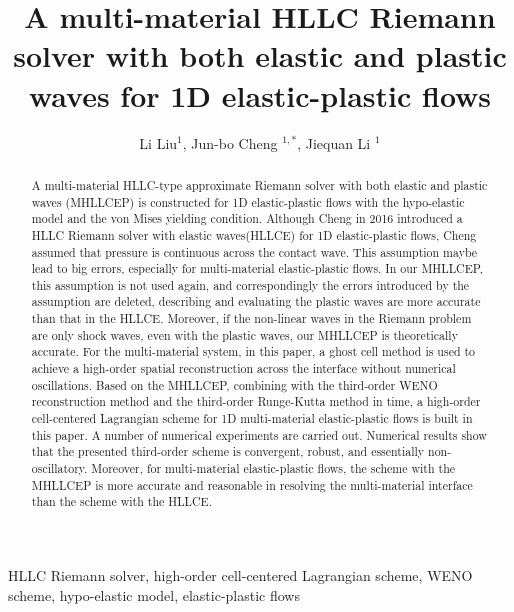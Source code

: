 \documentclass[review]{elsarticle}
\begin{document}
\begin{frontmatter}

\title{A multi-material HLLC Riemann solver with both elastic and plastic waves for 1D  elastic-plastic flows}
\author{Li Liu$^1$, Jun-bo Cheng $^{1,*}$, Jiequan Li $^{1}$}

\maketitle

\address{$^1$  Institute of Applied Physics and Computational Mathematics, Beijing 100094, China }

\begin{abstract}
  A multi-material HLLC-type  approximate Riemann solver with both elastic and plastic waves (MHLLCEP) is constructed for 1D elastic-plastic flows with the  hypo-elastic model and the von Mises yielding condition. Although Cheng in 2016 introduced a HLLC Riemann solver with elastic waves(HLLCE) for 1D elastic-plastic flows, Cheng assumed that pressure is continuous across the contact wave. This assumption maybe lead to big errors, especially for multi-material elastic-plastic flows. In our MHLLCEP, this assumption is not used again, and correspondingly the errors introduced by the assumption are deleted, describing and evaluating the plastic waves are more accurate than that in the HLLCE. Moreover, if the non-linear waves in the Riemann problem are only shock waves, even with the plastic waves, our MHLLCEP is theoretically accurate. For  the multi-material system, in this paper, a ghost cell method is used to achieve a high-order spatial reconstruction across the interface without numerical oscillations. Based on the MHLLCEP, combining with the third-order WENO reconstruction method and the third-order Runge-Kutta method in time, a high-order cell-centered Lagrangian scheme for 1D multi-material elastic-plastic flows is built in this paper. A number of numerical experiments are carried out. Numerical results show  that the presented third-order scheme is convergent, robust, and essentially non-oscillatory. Moreover, for multi-material elastic-plastic flows, the scheme with  the MHLLCEP is more accurate and reasonable in resolving the multi-material interface than the scheme with the  HLLCE.
\end{abstract}

\begin{keyword}
  HLLC Riemann solver, high-order cell-centered Lagrangian scheme,  WENO scheme,  hypo-elastic model, elastic-plastic flows
\end{keyword}

\end{frontmatter}
\end{document}
